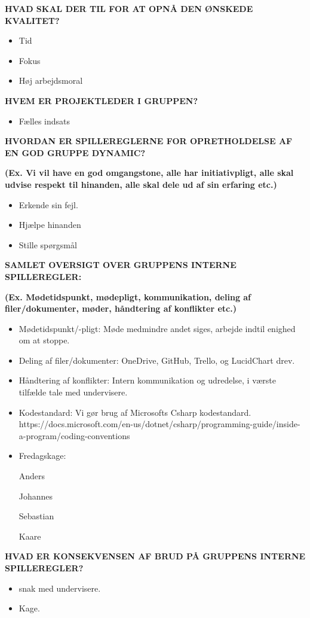 \textbf{HVAD SKAL DER TIL FOR AT OPNÅ DEN ØNSKEDE KVALITET? }
\begin{itemize}
\item Tid 

\item Fokus 

\item Høj arbejdsmoral 
\end{itemize}

\textbf{HVEM ER PROJEKTLEDER I GRUPPEN? }
\begin{itemize}
\item Fælles indsats 
\end{itemize}

\textbf{HVORDAN ER SPILLEREGLERNE FOR OPRETHOLDELSE AF EN GOD GRUPPE DYNAMIC?  }

\textbf{(Ex. Vi vil have en god omgangstone, alle har initiativpligt, alle skal udvise respekt til hinanden, alle skal dele ud af sin erfaring etc.) }
\begin{itemize}
\item Erkende sin fejl.  

\item Hjælpe hinanden 

\item Stille spørgsmål 
\end{itemize}

\textbf{SAMLET OVERSIGT OVER GRUPPENS INTERNE SPILLEREGLER:}  

\textbf{(Ex. Mødetidspunkt, mødepligt, kommunikation, deling af filer/dokumenter, møder, håndtering af konflikter etc.) }

 
\begin{itemize}
\item Mødetidspunkt/-pligt: Møde medmindre andet siges, arbejde indtil enighed om at stoppe. 

\item Deling af filer/dokumenter: OneDrive, GitHub, Trello, og LucidChart drev. 

\item Håndtering af konflikter: Intern kommunikation og udredelse, i værste tilfælde tale med undervisere. 

\item Kodestandard: Vi gør brug af Microsofts Csharp kodestandard. https://docs.microsoft.com/en-us/dotnet/csharp/programming-guide/inside-a-program/coding-conventions  

\item Fredagskage: 

Anders 

Johannes 

Sebastian 

Kaare 
\end{itemize}
\textbf{HVAD ER KONSEKVENSEN AF BRUD PÅ GRUPPENS INTERNE SPILLEREGLER? }
\begin{itemize}
\item snak med undervisere. 

\item Kage. 
\end{itemize}
